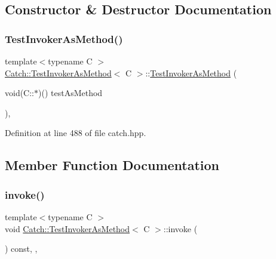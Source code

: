\subsection{Constructor \& Destructor Documentation}
\mbox{\label{class_catch_1_1_test_invoker_as_method_a119c4bdbbdd95c42859c18541987a1a4}} 
\subsubsection{\texorpdfstring{Test\+Invoker\+As\+Method()}{TestInvokerAsMethod()}}
{\footnotesize\ttfamily template$<$typename C $>$ \\
\mbox{\hyperlink{class_catch_1_1_test_invoker_as_method}{Catch\+::\+Test\+Invoker\+As\+Method}}$<$ C $>$\+::\mbox{\hyperlink{class_catch_1_1_test_invoker_as_method}{Test\+Invoker\+As\+Method}} (\begin{DoxyParamCaption}\item[{void(C\+::$\ast$)()}]{test\+As\+Method }\end{DoxyParamCaption})\hspace{0.3cm}{\ttfamily [inline]}, {\ttfamily [noexcept]}}



Definition at line 488 of file catch.\+hpp.



\subsection{Member Function Documentation}
\mbox{\label{class_catch_1_1_test_invoker_as_method_a8115a06efe273f4112ec0b5452c1b5f2}} 
\subsubsection{\texorpdfstring{invoke()}{invoke()}}
{\footnotesize\ttfamily template$<$typename C $>$ \\
void \mbox{\hyperlink{class_catch_1_1_test_invoker_as_method}{Catch\+::\+Test\+Invoker\+As\+Method}}$<$ C $>$\+::invoke (\begin{DoxyParamCaption}{ }\end{DoxyParamCaption}) const\hspace{0.3cm}{\ttfamily [inline]}, {\ttfamily [override]}, {\ttfamily [virtual]}}



